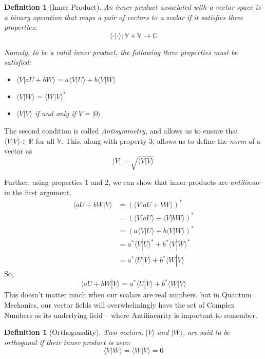 \documentclass[twoside]{article}
\newcommand{\ket}[1]{|#1 \rangle}
\newcommand{\inner}[2]{\langle #1 | #2 \rangle}
\newcommand{\R}{\mathbb{R}}
\newcommand{\C}{\mathbb{C}}
\newcommand{\V}{\mathbb{V}}
\newtheorem{definition}[theorem]{Definition}
\begin{document}
\begin{definition}[Inner Product]
   An inner product associated with a vector space is a binary operation that maps a pair of vectors to a scalar if it satisfies three properties:
   \[ \inner{\cdot}{\cdot} : \V \times \V \rightarrow \C \]

   Namely, to be a valid inner product, the following three properties must be satisfied:
   \begin{itemize}
      \item $\inner{V}{aU + bW} = a\inner{V}{U} + b\inner{V}{W}$
      
      \item $\inner{V}{W} = \inner{W}{V}^{*}$
      
      \item $\inner{V}{V}$ if and only if $V = \ket{0}$

   \end{itemize}
\end{definition}

The second condition is called \emph{Antisymmetry}, and allows us to ensure that $\inner{V}{V} \in \R$ for all $\V$. This, along with property 3, allows us to define the \emph{norm} of a vector as 
\[ |V| = \sqrt{\inner{V}{V}} \] 

Further, using properties 1 and 2, we can show that inner products are \emph{antilinear} in the first argument.
\begin{align*}
   \inner{aU + bW}{V} &= \left( \inner{V}{aU + bW} \right)^{*} \\
                      &= \left( \inner{V}{aU} + \inner{V}{bW} \right)^{*} \\
                      &= \left( a\inner{V}{U} + b\inner{V}{W} \right)^{*} \\
                      &= a^{*} \inner{V}{U}^{*} + b^{*} \inner{V}{W}^{*} \\
                      &= a^{*} \inner{U}{V} + b^{*} \inner{W}{V}
\end{align*}
So,
\[ \boxed{ \inner{aU + bW}{V} = a^{*} \inner{U}{V} + b^{*} \inner{W}{V} } \]
This doesn't matter much when our scalars are real numbers, but in Quantum Mechanics, our vector fields will overwhelmingly have the set of Complex Numbers as its underlying field -- where Antilinearity is important to remember.

\begin{definition}[Orthogonality]
   Two vectors, $\ket{V}$ and $\ket{W}$, are said to be orthogonal if their inner product is zero:
   \[ \inner{V}{W} = \inner{W}{V} = 0 \]
\end{definition}
\end{document}
